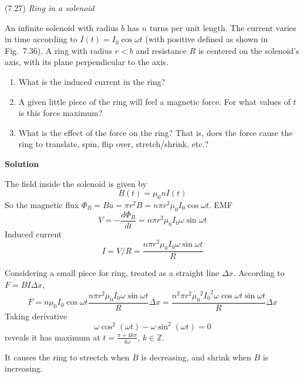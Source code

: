 \documentclass{article}
\begin{document}

\begin{homeworkProblem}
	(7.27) \textit{Ring in a solenoid}

	An infinite solenoid with radius $b$ has $n$ turns per unit length. The current varies in time according to $I(t)=I_0\cos\omega t$ (with positive defined as shown in Fig.~7.36). A ring with radius $r<b$ and resistance $R$ is centered on the solenoid's axis, with its plane perpendicular to the axis.
	\begin{enumerate}[label = (\alph*)]
		\item What is the induced current in the ring?
		\item A given little piece of the ring will feel a magnetic force. For what values of $t$ is this force maximum?
		\item What is the effect of the force on the ring? That is, does the force cause the ring to translate, spin, flip over, stretch/shrink, etc.?
	\end{enumerate}

	\textbf{Solution}
	\begin{enumerate}[label = (\alph*)]
		\begin{item}
			The field inside the solenoid is given by
			\[
				B(t)=\mu_0 n I(t)
			\]
			So the magnetic flux $\Phi_B=Ba=\pi r^2B=n\pi r^2\mu_0I_0\cos\omega t$. EMF
			\[
				V=-\frac{d\Phi_B}{dt}=n\pi r^2\mu_0I_0\omega\sin\omega t
			\]
			Induced current
			\[
				I=V/R=\frac{n\pi r^2\mu_0I_0\omega\sin\omega t}{R}
			\]
		\end{item}
		\begin{item}
			Considering a small piece for ring, treated as a straight line $\Delta x$. According to $F=BI\Delta x$,
			\[
				F=n\mu_0I_0\cos\omega t\frac{n\pi r^2\mu_0I_0\omega\sin\omega t}{R}\Delta x=\frac{n^2\pi r^2{\mu_0}^2{I_0}^2\omega\cos\omega t\sin\omega t}{R}\Delta x
			\]
			Taking derivative
			\[
				\omega\cos^2(\omega t)-\omega\sin^2(\omega t)=0
			\]
			reveals it has maximum at $t=\frac{\pi+4k\pi}{4\omega}$, $k\in\mathbb{Z}$.
		\end{item}
		\begin{item}
			It causes the ring to strectch when $B$ is decreasing, and shrink when $B$ is increasing.
		\end{item}
	\end{enumerate}
	
\end{homeworkProblem}
\end{document}
